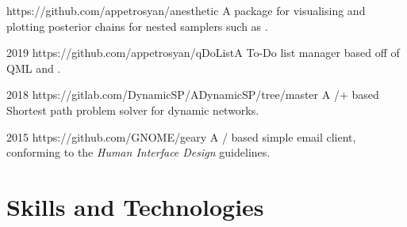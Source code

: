 \documentclass{CurriculumVitae}[10pt, draft, condensed]
\begin{document}
{   {https://github.com/appetrosyan/anesthetic}
  {A package for visualising and plotting posterior chains for nested
    samplers such as .}

   {2019} {https://github.com/appetrosyan/qDoList}{A
    To-Do list manager based off of QML and .}

   {2018}
  {https://gitlab.com/DynamicSP/ADynamicSP/tree/master} {A
    /+ based Shortest path problem solver for
    dynamic networks. }

   {2015} {https://github.com/GNOME/geary} {A
    / based simple email client, conforming to the
     \emph{Human Interface Design} guidelines.}

}
\pagebreak{}
\section*{Skills and Technologies}
\end{document}
